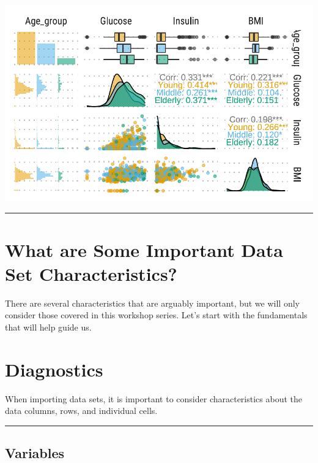 \documentclass[
  letterpaper,
  DIV=11,
  numbers=noendperiod]{scrreprt}
\begin{document}
\includegraphics{./intro_files/figure-pdf/unnamed-chunk-1-1.pdf}

\begin{center}\rule{0.5\linewidth}{0.5pt}\end{center}

\hypertarget{what-are-some-important-data-set-characteristics}{%
\section{\texorpdfstring{\textbf{What are Some Important Data Set
Characteristics?}}{What are Some Important Data Set Characteristics?}}\label{what-are-some-important-data-set-characteristics}}

There are several characteristics that are arguably important, but we
will only consider those covered in this workshop series. Let's start
with the fundamentals that will help guide us.

\hypertarget{diagnostics}{%
\section{Diagnostics}\label{diagnostics}}

When importing data sets, it is important to consider characteristics
about the data columns, rows, and individual cells.

\begin{center}\rule{0.5\linewidth}{0.5pt}\end{center}

\hypertarget{variables}{%
\subsection{Variables}\label{variables}}
\end{document}
